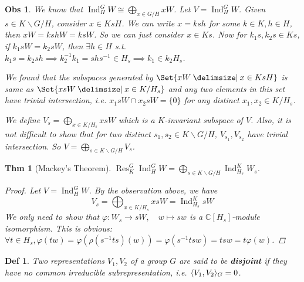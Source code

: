 \documentclass[a4paper]{article}
\DeclarePairedDelimiter{\inpd}{\langle}{\rangle} %
\newcommand*{\Cb}{\mathbb{C}}
\DeclareMathOperator{\Res}{Res}
\DeclareMathOperator{\Ind}{Ind}
\newcommand*\bsl{\backslash}
\providecommand\given{}
\newcommand*\SetSymbol[1][]{%
  \nonscript\:#1\vert
  \allowbreak
  \nonscript\:
\mathopen{}}
\renewcommand\given{\SetSymbol[\delimsize]}
\renewcommand\given{\SetSymbol[\delimsize]}
\theoremstyle{mystyle}
\newtheorem{theorem}{Thm}
\newtheorem{observation}{Obs}
\newtheorem{definition}{Def}
\begin{document}
\begin{observation}
  We know that $\Ind^G_H W \cong \bigoplus_{x\in G/H} xW$. Let $V = \Ind^G_H W$.
  Given $s \in K\bsl G/H$, consider $x \in KsH$. We can write $x = ksh$ for
  some $k\in K, h \in H$, then $xW = kshW = ksW$. So we can just consider
  $x \in Ks$.
  Now for $k_1s, k_2s\in Ks$, if $k_1sW = k_2sW$, then $\exists h\in H$ s.t.
  $k_1s = k_2sh \implies k_2^{-1}k_1 = shs^{-1} \in H_s \implies
  k_1 \in k_2H_s$.

  We found that the subspaces generated by $\Set{ xW \given x\in KsH}$ is
  same as $\Set{ xsW \given x \in K/H_s}$ and any two elements in this
  set have trivial intersection, i.e. $x_1sW \cap x_2sW = \{0\}$ for any
  distinct $x_1, x_2 \in K/H_s$.

  We define $\displaystyle V_s = \bigoplus_{x\in K/H_s} xsW$ which is a
  $K$-invariant subspace of $V$. Also, it is not difficult to show that for
  two distinct $s_1, s_2 \in K\bsl G/H$, $V_{s_1}, V_{s_2}$ have trivial
  intersection. So $\displaystyle V = \bigoplus_{s\in K\bsl G/H} V_s$.
\end{observation}

\begin{theorem}[Mackey's Theorem]
  \label{thm:mackey}
  $\displaystyle \Res^G_K \Ind^G_H W = \bigoplus_{s\in K\bsl G/H} \Ind^K_{H_s} W_s$.
  \begin{proof}
    Let $V = \Ind^G_H W$. By the observation above, we have
    \[
      V_s = \bigoplus_{x\in K/H_s} xsW = \Ind^K_{H_s} sW
    \]
    We only need to show that $\varphi: W_s \to sW, \quad w \mapsto sw$
    is a $\Cb[H_s]$-module isomorphism.
    This is obvious: $\forall t\in H_s, \varphi(tw) = \varphi(\rho(s^{-1}ts)(w))
    = \varphi(s^{-1}tsw) = tsw = t\varphi(w)$.
  \end{proof}
\end{theorem}

\begin{definition}
  Two representations $V_1, V_2$ of a group $G$ are said to be {\bf disjoint}
  if they have no common irreducible subrepresentation, i.e.
  $\inpd{V_1, V_2}_G = 0$.
\end{definition}
\end{document}
